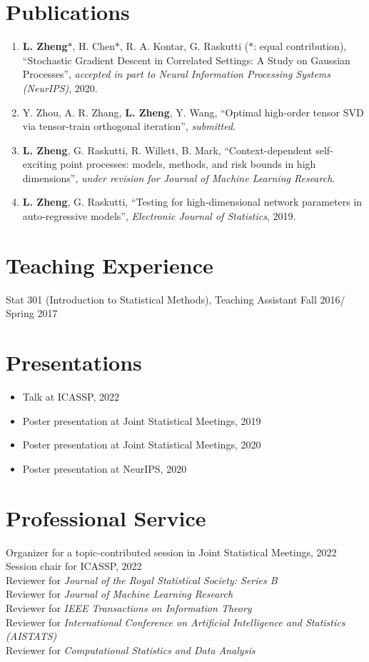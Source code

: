 \documentclass[letterpaper,11pt]{article}
\begin{document}
	\section{Publications}
	\begin{enumerate}
		\item {\bf L. Zheng}$*$, H. Chen$*$, R. A. Kontar, G. Raskutti ($*$: equal contribution), ``Stochastic Gradient Descent in Correlated Settings: A Study on Gaussian Processes'', {\em accepted in part to Neural Information Processing Systems (NeurIPS)}, 2020.%
		\item Y. Zhou, A. R. Zhang, {\bf L. Zheng}, Y. Wang, ``Optimal high-order tensor SVD via tensor-train orthogonal
			iteration'', {\em  submitted}.
		\item {\bf L. Zheng}, G. Raskutti, R. Willett, B. Mark, ``Context-dependent self-exciting point processes: models, methods, and risk bounds in high dimensions'', {\em under revision for Journal of Machine Learning Research}.    
		\item {\bf L. Zheng}, G. Raskutti, ``Testing for high-dimensional network parameters in auto-regressive models'', {\em Electronic Journal of Statistics}, 2019.
	\end{enumerate}
	
	
	\section{Teaching Experience}
	Stat 301 (Introduction to Statistical Methods), Teaching Assistant \hfill Fall 2016/ Spring 2017
	\section{Presentations}
	\begin{itemize}
		\item Talk at ICASSP, 2022
		\item Poster presentation at Joint Statistical Meetings, 2019 
		\item Poster presentation at Joint Statistical Meetings, 2020
		\item Poster presentation at NeurIPS, 2020
	\end{itemize}
	\section{Professional Service}
	Organizer for a topic-contributed session in Joint Statistical Meetings, 2022\\
	Session chair for ICASSP, 2022\\
	Reviewer for {\em Journal of the Royal Statistical Society: Series B} \\
	Reviewer for {\em Journal of Machine Learning Research} \\
	Reviewer for {\em IEEE Transactions on Information Theory}\\
	Reviewer for {\em International Conference on Artificial Intelligence and Statistics (AISTATS)}\\
	Reviewer for {\em Computational Statistics and Data Analysis}
\end{document}
